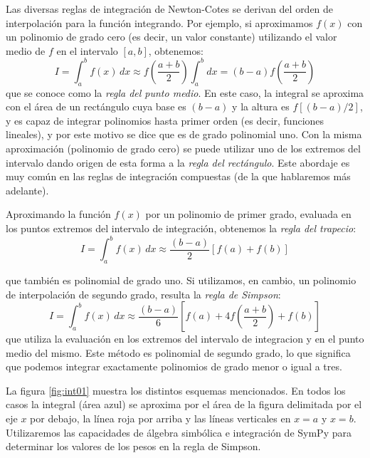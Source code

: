 Las diversas reglas de integración de Newton-Cotes se derivan del orden de interpolación para la función integrando. Por ejemplo, si aproximamos $f(x)$ con un polinomio de grado cero (es decir, un valor constante) utilizando el valor medio de $f$ en el intervalo $[a, b]$, obtenemos:
\begin{equation}\label{eq:int03}
I = \int_a^b f(x) \, dx \approx f \left( \frac{a + b}{2}  \right) \int_a^b dx = (b - a) f \left( \frac{a + b}{2}  \right)
\end{equation} 
que se conoce como la \textit{regla del punto medio}. En este caso, la integral se aproxima con el área de un rectángulo cuya base es $(b-a)$ y la altura es $f[(b-a)/2]$, y es capaz de integrar polinomios hasta primer orden (es decir, funciones lineales), y por este motivo se dice que es de grado polinomial uno. Con la misma aproximación (polinomio de grado cero) se puede utilizar uno de los extremos del intervalo dando origen de esta forma a la \textit{regla del rectángulo}. Este abordaje es muy común en las reglas de integración compuestas (de la que hablaremos más adelante).

Aproximando la función $f(x)$ por un polinomio de primer grado, evaluada en los puntos extremos del intervalo de integración, obtenemos la \textit{regla del trapecio}:
\begin{equation}\label{eq:int04}
I = \int_a^b f(x) \, dx \approx \frac{(b-a)}{2} \left[ f(a) + f(b) \right]
\end{equation} 

que también es polinomial de grado uno. Si utilizamos, en cambio, un polinomio de interpolación de segundo grado, resulta la \textit{regla de Simpson}:
\begin{equation}\label{eq:int05}
I = \int_a^b f(x) \, dx \approx \frac{(b-a)}{6} \left[ f(a) + 4 f\left( \frac{a+b}{2} \right) + f(b) \right]
\end{equation} 
que utiliza la evaluación en los extremos del intervalo de integracion y en el punto medio del mismo. Este método es polinomial de segundo grado, lo que significa que podemos integrar exactamente polinomios de grado menor o igual a tres.

La figura \ref{fig:int01} muestra los distintos esquemas mencionados. En todos los casos la integral (área azul) se aproxima por el área de la figura delimitada por el eje $x$ por debajo, la línea roja por arriba y las líneas verticales en $x=a$ y $x=b$. Utilizaremos las capacidades de álgebra simbólica e integración de SymPy para determinar los valores de los pesos en la regla de Simpson.

